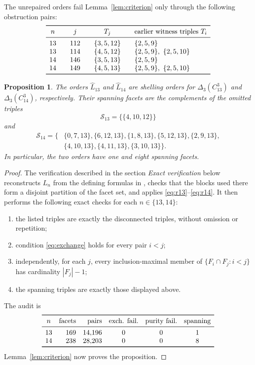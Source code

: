 \documentclass[11pt]{amsart}
\newtheorem{proposition}[theorem]{Proposition}
\theoremstyle{remark}
\newcommand{\triple}[3]{\{#1,#2,#3\}}
\begin{document}
The unrepaired orders fail Lemma~\ref{lem:criterion} only through the
following obstruction pairs:
\[
\begin{array}{c@{\qquad}c@{\qquad}c@{\qquad}l}
\toprule
n & j & T_j & \text{earlier witness triples }T_i\\
\midrule
13 & 112 & \triple{3}{5}{12} & \triple{2}{5}{9}\\
13 & 114 & \triple{4}{5}{12} & \triple{2}{5}{9},\ \triple{2}{5}{10}\\
14 & 146 & \triple{3}{5}{13} & \triple{2}{5}{9}\\
14 & 149 & \triple{4}{5}{13} & \triple{2}{5}{9},\ \triple{2}{5}{10}\\
\bottomrule
\end{array}
\]

\begin{proposition}\label{prop:certificates}
The orders $\widehat L_{13}$ and $\widehat L_{14}$ are shelling orders for
$\Delta_3(C_{13}^3)$ and $\Delta_3(C_{14}^3)$, respectively.  Their spanning
facets are the complements of the omitted triples
\[
  \mathcal S_{13}=\{\triple{4}{10}{12}\}
\]
and
\[
\begin{aligned}
  \mathcal S_{14}=\{&\triple{0}{7}{13},\triple{6}{12}{13},
  \triple{1}{8}{13},\triple{5}{12}{13},
  \triple{2}{9}{13},\\
  &\triple{4}{10}{13},\triple{4}{11}{13},
  \triple{3}{10}{13}\}.
\end{aligned}
\]
In particular, the two orders have one and eight spanning facets.
\end{proposition}

\begin{proof}
The verification described in the section \emph{Exact verification} below
reconstructs $L_n$ from the defining formulas in \cite{CS}, checks that the
blocks used there form a disjoint partition of the facet set, and applies
\eqref{eq:r13}--\eqref{eq:r14}.  It then performs the following exact checks
for each $n\in\{13,14\}$:
\begin{enumerate}
\item the listed triples are exactly the disconnected triples, without
      omission or repetition;
\item condition \eqref{eq:exchange} holds for every pair $i<j$;
\item independently, for each $j$, every inclusion-maximal member of
      $\{F_i\cap F_j:i<j\}$ has cardinality $|F_j|-1$;
\item the spanning triples are exactly those displayed above.
\end{enumerate}
The audit is
\[
\begin{array}{c@{\quad}r@{\quad}r@{\quad}c@{\quad}c@{\quad}c}
\toprule
n & \text{facets} & \text{pairs} & \text{exch. fail.} &
\text{purity fail.} & \text{spanning}\\
\midrule
13 & 169 & 14{,}196 & 0 & 0 & 1\\
14 & 238 & 28{,}203 & 0 & 0 & 8\\
\bottomrule
\end{array}
\]
Lemma~\ref{lem:criterion} now proves the proposition.
\end{proof}
\end{document}
